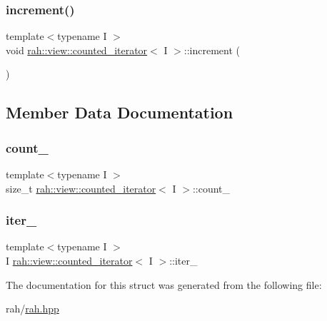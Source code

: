 \subsubsection{\texorpdfstring{increment()}{increment()}}
{\footnotesize\ttfamily template$<$typename I $>$ \\
void \mbox{\hyperlink{structrah_1_1view_1_1counted__iterator}{rah\+::view\+::counted\+\_\+iterator}}$<$ I $>$\+::increment (\begin{DoxyParamCaption}{ }\end{DoxyParamCaption})\hspace{0.3cm}{\ttfamily [inline]}}



\subsection{Member Data Documentation}
\mbox{\label{structrah_1_1view_1_1counted__iterator_a235949f8f72f083b6a65e6f385327d42}} 
\subsubsection{\texorpdfstring{count\_}{count\_}}
{\footnotesize\ttfamily template$<$typename I $>$ \\
size\+\_\+t \mbox{\hyperlink{structrah_1_1view_1_1counted__iterator}{rah\+::view\+::counted\+\_\+iterator}}$<$ I $>$\+::count\+\_\+}

\mbox{\label{structrah_1_1view_1_1counted__iterator_a907dba6ac64293e4c5718e522da4972e}} 
\subsubsection{\texorpdfstring{iter\_}{iter\_}}
{\footnotesize\ttfamily template$<$typename I $>$ \\
I \mbox{\hyperlink{structrah_1_1view_1_1counted__iterator}{rah\+::view\+::counted\+\_\+iterator}}$<$ I $>$\+::iter\+\_\+}



The documentation for this struct was generated from the following file\+:\begin{DoxyCompactItemize}
\item 
rah/\mbox{\hyperlink{rah_8hpp}{rah.\+hpp}}\end{DoxyCompactItemize}
